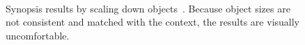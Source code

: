 \documentclass[11pt]{hyu_thesis}
\begin{document}
\begin{figure}
	\centering
	\\
	\caption{Synopsis results by scaling down objects~\cite{Li2016a}. Because object sizes are not consistent and matched with the context, the results are visually uncomfortable.}
	\label{fig:Li}
\end{figure}
\end{document}
